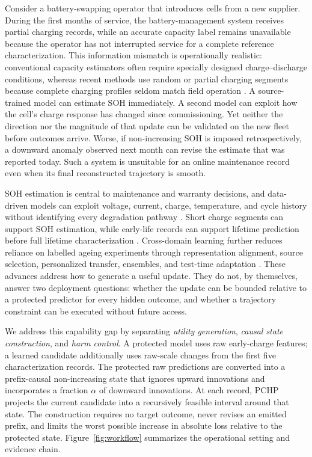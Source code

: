 \documentclass[11pt]{article}
\begin{document}
Consider a battery-swapping operator that introduces cells from a new supplier. During the first months of service, the battery-management system receives partial charging records, while an accurate capacity label remains unavailable because the operator has not interrupted service for a complete reference characterization. This information mismatch is operationally realistic: conventional capacity estimators often require specially designed charge--discharge conditions, whereas recent methods use random or partial charging segments because complete charging profiles seldom match field operation \citep{liu2023rapid,zhang2024flexible}. A source-trained model can estimate SOH immediately. A second model can exploit how the cell's charge response has changed since commissioning. Yet neither the direction nor the magnitude of that update can be validated on the new fleet before outcomes arrive. Worse, if non-increasing SOH is imposed retrospectively, a downward anomaly observed next month can revise the estimate that was reported today. Such a system is unsuitable for an online maintenance record even when its final reconstructed trajectory is smooth.

SOH estimation is central to maintenance and warranty decisions, and data-driven models can exploit voltage, current, charge, temperature, and cycle history without identifying every degradation pathway \citep{ng2020mlbattery,roman2021pipeline}. Short charge segments can support SOH estimation, while early-life records can support lifetime prediction before full lifetime characterization \citep{roman2021pipeline,severson2019cyclelife}. Cross-domain learning further reduces reliance on labelled ageing experiments through representation alignment, source selection, personalized transfer, ensembles, and test-time adaptation \citep{li2020sstca,ma2022personalized,lu2023without,duan2025wasserstein,feng2024batteryttt}. These advances address how to generate a useful update. They do not, by themselves, answer two deployment questions: whether the update can be bounded relative to a protected predictor for every hidden outcome, and whether a trajectory constraint can be executed without future access.

We address this capability gap by separating \emph{utility generation}, \emph{causal state construction}, and \emph{harm control}. A protected model uses raw early-charge features; a learned candidate additionally uses raw-scale changes from the first five characterization records. The protected raw predictions are converted into a prefix-causal non-increasing state that ignores upward innovations and incorporates a fraction $\alpha$ of downward innovations. At each record, PCHP projects the current candidate into a recursively feasible interval around that state. The construction requires no target outcome, never revises an emitted prefix, and limits the worst possible increase in absolute loss relative to the protected state. Figure~\ref{fig:workflow} summarizes the operational setting and evidence chain.
\end{document}
